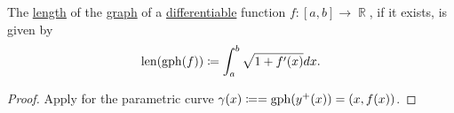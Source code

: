 \begin{corollary}\label{thm:length_of_function_graph}
  The \hyperref[def:length_of_parametric_curve]{length} of the \hyperref[def:function/graph]{graph} of a \hyperref[def:differentiability/frechet]{differentiable} function \( f: [a, b] \to \BbbR \), if it exists, is given by
  \begin{equation*}
    \operatorname{len}(\operatorname{gph}(f)) \coloneqq \int_a^b \sqrt{1 + f'(x)} dx.
  \end{equation*}
\end{corollary}
\begin{proof}
  Apply  for the parametric curve \( \gamma(x) \coloneqq = \operatorname{gph}(y^+(x)) = (x, f(x)) \).
\end{proof}
